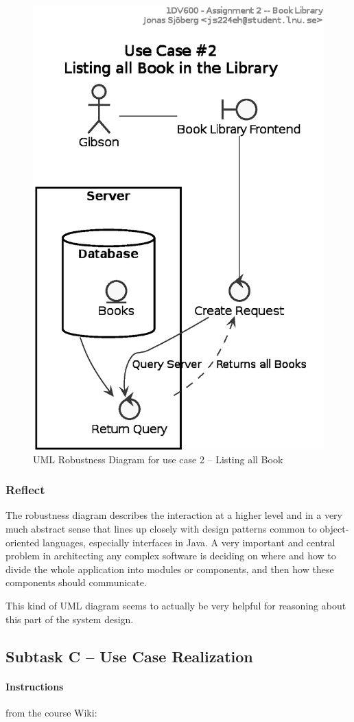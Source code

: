 \begin{figure}[htbp]
  \centering
  \includegraphics[width=0.5\linewidth]{include/uml-use-case-2-rob.eps}
  \caption{UML Robustness Diagram for use case 2 -- Listing all Book}
  \label{fig:uml-usecase2rob}
\end{figure}


\subsubsection{Reflect}\label{task-1b-reflect}
The robustness diagram describes the interaction at a higher level and in a
very much abstract sense  that lines up closely with design patterns common to
object-oriented languages, especially interfaces in Java.
A very important and central problem in architecting any complex software is
deciding on where and how to divide the whole application into modules or
components, and then how these components should communicate.

This kind of UML diagram seems to actually be very helpful for reasoning about
this part of the system design.



\subsection{Subtask C -- Use Case Realization}\label{task-1c}
\paragraph{Instructions}\label{task-1c-instructions}
from the course Wiki\cite{1dv600:lab2:instructions}:

